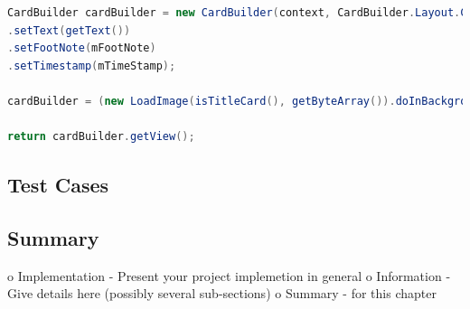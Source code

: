 \begin{lstlisting}[language=Java, caption={Initialisation of the CardBuilder class}, label=todo]
CardBuilder cardBuilder = new CardBuilder(context, CardBuilder.Layout.COLUMNS);
.setText(getText())
.setFootNote(mFootNote)
.setTimestamp(mTimeStamp);

cardBuilder = (new LoadImage(isTitleCard(), getByteArray()).doInBackground(cardBuilder));

return cardBuilder.getView();
\end{lstlisting}



\subsection{Test Cases}


\subsection{Summary}
\label{subsec:summary}


o   Implementation - Present your project implemetion in general
o   Information - Give details here (possibly several sub-sections)
o   Summary - for this chapter

% 

